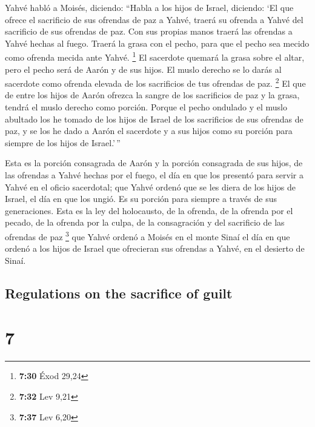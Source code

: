 \begin{paracol}{2}
 Yahvé habló a Moisés, diciendo:  ``Habla
a los hijos de Israel, diciendo: `El que ofrece el sacrificio de sus
ofrendas de paz a Yahvé, traerá su ofrenda a Yahvé del sacrificio de sus
ofrendas de paz.  Con sus propias manos traerá las
ofrendas a Yahvé hechas al fuego. Traerá la grasa con el pecho, para que
el pecho sea mecido como ofrenda mecida ante Yahvé. \footnote{\textbf{7:30}
  Éxod 29,24}  El sacerdote quemará la grasa sobre el
altar, pero el pecho será de Aarón y de sus hijos.  El
muslo derecho se lo darás al sacerdote como ofrenda elevada de los
sacrificios de tus ofrendas de paz. \footnote{\textbf{7:32} Lev 9,21}
 El que de entre los hijos de Aarón ofrezca la sangre de
los sacrificios de paz y la grasa, tendrá el muslo derecho como porción.
 Porque el pecho ondulado y el muslo abultado los he
tomado de los hijos de Israel de los sacrificios de sus ofrendas de paz,
y se los he dado a Aarón el sacerdote y a sus hijos como su porción para
siempre de los hijos de Israel.'\,''

 Esta es la porción consagrada de Aarón y la porción
consagrada de sus hijos, de las ofrendas a Yahvé hechas por el fuego, el
día en que los presentó para servir a Yahvé en el oficio sacerdotal;
 que Yahvé ordenó que se les diera de los hijos de
Israel, el día en que los ungió. Es su porción para siempre a través de
sus generaciones.  Esta es la ley del holocausto, de la
ofrenda, de la ofrenda por el pecado, de la ofrenda por la culpa, de la
consagración y del sacrificio de las ofrendas de paz \footnote{\textbf{7:37}
  Lev 6,20}  que Yahvé ordenó a Moisés en el monte Sinaí
el día en que ordenó a los hijos de Israel que ofrecieran sus ofrendas a
Yahvé, en el desierto de Sinaí.

\switchcolumn
\begin{otherlanguage}{english}

\hypertarget{regulations-on-the-sacrifice-of-guilt}{%
\subsection{Regulations on the sacrifice of
guilt}\label{regulations-on-the-sacrifice-of-guilt}}

\hypertarget{section-13}{%
\section{7}\label{section-13}}


\end{otherlanguage}
\end{paracol}
